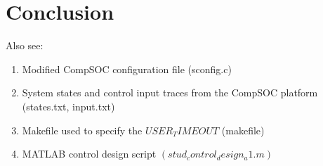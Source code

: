 \section{Conclusion}

Also see:
\begin{enumerate}
	\item Modified	CompSOC configuration	file	(sconfig.c)
	\item System	states	and	control	input	traces	from	the	CompSOC platform	(states.txt,	
	input.txt)
	\item Makefile used	to	specify	the	$USER_TIMEOUT$	(makefile)
	\item MATLAB	control	design	script	$(stud_control_design_a1.m)$
\end{enumerate}
